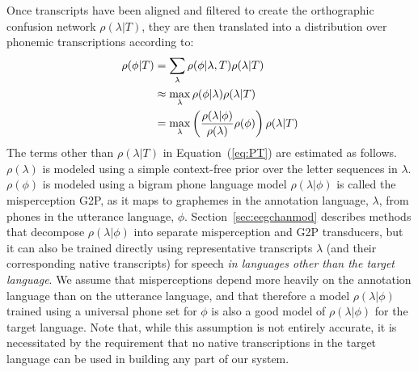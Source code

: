 Once transcripts have
been aligned and filtered to create the orthographic confusion network
$\rho(\lambda|T)$, they are then translated into a distribution over
phonemic transcriptions according to:
\begin{align}
  \rho(\phi|T) &=
  \sum_{\lambda} \rho(\phi|\lambda,T) \rho(\lambda|T) \notag \\
  &\approx \max_{\lambda}  \rho(\phi|\lambda) \rho(\lambda|T) \notag \\
  &= \max_{\lambda}  \left(\frac{\rho(\lambda|\phi)}{\rho(\lambda)}
  \rho(\phi)\right) \rho(\lambda|T) 
\label{eq:PT}
\end{align}
The terms other than $\rho(\lambda|T)$ in Equation~(\ref{eq:PT}) are
estimated as follows.  $\rho(\lambda)$ is modeled using a simple
context-free prior over the letter sequences in $\lambda$.
$\rho(\phi)$ is modeled using a bigram phone language model
$\rho(\lambda|\phi)$ is called the misperception G2P, as it maps to
graphemes in the annotation language, $\lambda$, from phones in the
utterance language, $\phi$.  Section~\ref{sec:eegchanmod} describes
methods that decompose $\rho(\lambda|\phi)$ into separate
misperception and G2P transducers, but it can also be trained directly
using
representative transcripts $\lambda$ (and their
corresponding native transcripts) for speech {\em in languages other
than the target language}. We assume that misperceptions depend more
heavily on the annotation language than on the utterance language, and
that therefore a model $\rho(\lambda|\phi)$ trained using a universal
phone set for $\phi$ is also a good model of $\rho(\lambda|\phi)$ for
the target language. Note that, while this assumption is not entirely
accurate, it is necessitated by the requirement that no native
transcriptions in the target language can be used in building any part
of our system.

